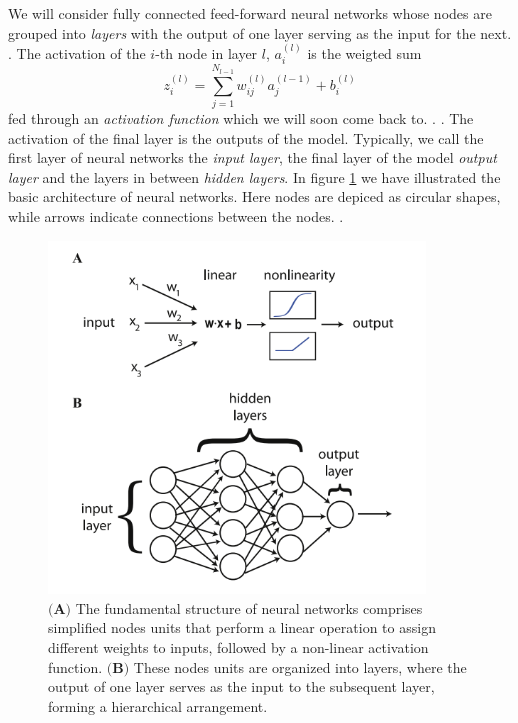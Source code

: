 \documentclass[a4paper, UKenglish, 11pt]{uiomaster}
\begin{document}
We will consider fully connected feed-forward  neural networks whose nodes are grouped into \emph{layers} with the output of one layer serving as the input for the next. . The activation of the $i$-th node in layer $l$, $a_i^{(l)}$ is the weigted sum
\begin{equation}
  z_i^{(l)} = \sum_{j=1}^{N_{l-1}} w_{ij}^{(l)} a_{j}^{(l-1)} + b_i^{(l)}
\end{equation}
fed through an \emph{activation function} which we will soon come back to. . . The activation of the final layer is the outputs of the model. Typically, we call the first layer of neural networks the \emph{input layer}, the final layer of the model \emph{output layer} and the layers in between \emph{hidden layers}. In figure \ref{fig:NN_basic_architecture} we have illustrated the basic architecture of neural networks. Here nodes are depiced as circular shapes, while arrows indicate connections between the nodes. .

\begin{figure}
    \centering
    \includegraphics[width=10cm]{figures/basic_architecture.png}
    \caption{$\textbf{(A)}$ The fundamental structure of neural networks comprises simplified nodes units that perform a linear operation to assign different weights to inputs, followed by a non-linear activation function. $\textbf{(B)}$ These nodes units are organized into layers, where the output of one layer serves as the input to the subsequent layer, forming a hierarchical arrangement. }
    \label{fig:NN_basic_architecture}
\end{figure}
\end{document}
